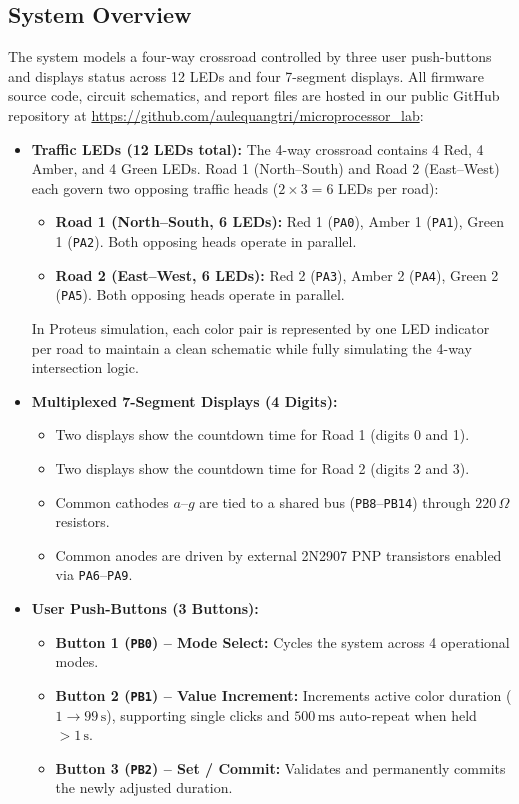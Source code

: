 \documentclass{hcmut-report}
\begin{document}
\subsection{System Overview}
The system models a four-way crossroad controlled by three user push-buttons and displays status across 12 LEDs and four 7-segment displays. All firmware source code, circuit schematics, and report files are hosted in our public GitHub repository at \url{https://github.com/aulequangtri/microprocessor_lab}:
\begin{itemize}
    \item \textbf{Traffic LEDs (12 LEDs total):} The 4-way crossroad contains 4 Red, 4 Amber, and 4 Green LEDs. Road 1 (North--South) and Road 2 (East--West) each govern two opposing traffic heads ($2 \times 3 = 6$ LEDs per road):
    \begin{itemize}
        \item \textbf{Road 1 (North--South, 6 LEDs):} Red 1 (\texttt{PA0}), Amber 1 (\texttt{PA1}), Green 1 (\texttt{PA2}). Both opposing heads operate in parallel.
        \item \textbf{Road 2 (East--West, 6 LEDs):} Red 2 (\texttt{PA3}), Amber 2 (\texttt{PA4}), Green 2 (\texttt{PA5}). Both opposing heads operate in parallel.
    \end{itemize}
    In Proteus simulation, each color pair is represented by one LED indicator per road to maintain a clean schematic while fully simulating the 4-way intersection logic.
    \item \textbf{Multiplexed 7-Segment Displays (4 Digits):}
    \begin{itemize}
        \item Two displays show the countdown time for Road 1 (digits 0 and 1).
        \item Two displays show the countdown time for Road 2 (digits 2 and 3).
        \item Common cathodes $a$--$g$ are tied to a shared bus (\texttt{PB8}--\texttt{PB14}) through $220\,\Omega$ resistors.
        \item Common anodes are driven by external 2N2907 PNP transistors enabled via \texttt{PA6}--\texttt{PA9}.
    \end{itemize}
    \item \textbf{User Push-Buttons (3 Buttons):}
    \begin{itemize}
        \item \textbf{Button 1 (\texttt{PB0}) -- Mode Select:} Cycles the system across 4 operational modes.
        \item \textbf{Button 2 (\texttt{PB1}) -- Value Increment:} Increments active color duration ($1 \to 99\,\text{s}$), supporting single clicks and $500\,\text{ms}$ auto-repeat when held $> 1\,\text{s}$.
        \item \textbf{Button 3 (\texttt{PB2}) -- Set / Commit:} Validates and permanently commits the newly adjusted duration.
    \end{itemize}
\end{itemize}
\end{document}

